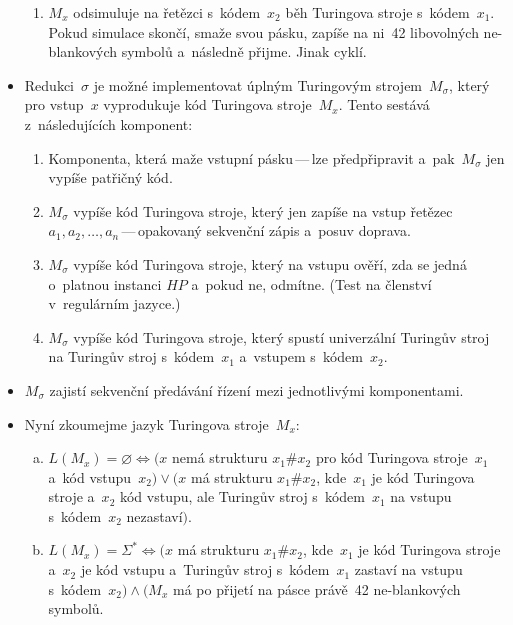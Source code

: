 \documentclass[a4paper, 11pt]{scrartcl}
\begin{document}
\begin{itemize}
\begin{enumerate}
				\item
					$ M_x $ odsimuluje na řetězci s~kódem~$ x_2 $ běh
					Turingova stroje s~kódem~$ x_1 $. Pokud simulace
					skončí, smaže svou pásku, zapíše na ni~42
					libovolných ne-blankových symbolů a~následně přijme.
					Jinak cyklí.
			\end{enumerate}

		\item
			Redukci~$ \sigma $ je možné implementovat úplným Turingovým
			strojem~$ M_\sigma $, který pro vstup~$ x $ vyprodukuje
			kód Turingova stroje~$ M_x $. Tento sestává z~následujících
			komponent:

			\begin{enumerate}
				\item
					Komponenta, která maže vstupní pásku\,---\,lze
					předpřipravit a~pak~$ M_\sigma $ jen vypíše
					patřičný kód.

				\item
					$ M_\sigma $ vypíše kód Turingova stroje, který
					jen zapíše na vstup řetězec $ a_1, a_2, \ldots,
					a_n $\,---\,opakovaný sekvenční zápis a~posuv
					doprava.

				\item
					$ M_\sigma $ vypíše kód Turingova stroje, který
					na vstupu ověří, zda se jedná o~platnou instanci
					$ HP $ a~pokud ne, odmítne. (Test na členství
					v~regulárním jazyce.)

				\item
					$ M_\sigma $ vypíše kód Turingova stroje, který
					spustí univerzální Turingův stroj na Turingův
					stroj s~kódem~$ x_1 $ a~vstupem s~kódem~$ x_2 $.
			\end{enumerate}

		\item
			$ M_\sigma $ zajistí sekvenční předávání řízení mezi
			jednotlivými komponentami.

		\item
			Nyní zkoumejme jazyk Turingova stroje~$ M_x $:

			\begin{enumerate}[a)]
				\item
					$ L(M_x) = \varnothing \Leftrightarrow ( x $
					nemá strukturu $ x_1\#x_2 $ pro kód Turingova
					stroje~$ x_1 $ a~kód vstupu~$ x_2) \vee ( x $
					má strukturu $ x_1\#x_2 $, kde~$ x_1 $ je kód
					Turingova stroje a~$ x_2 $ kód vstupu, ale
					Turingův stroj s~kódem~$ x_1 $ na vstupu
					s~kódem~$ x_2 $ nezastaví$ ) $.

				\item
					$ L(M_x) = \Sigma^* \Leftrightarrow ( x $
					má strukturu $ x_1\#x_2 $, kde~$ x_1 $ je kód
					Turingova stroje a~$ x_2 $ je kód vstupu
					a~Turingův stroj s~kódem~$ x_1 $ zastaví na
					vstupu s~kódem~$ x_2) \wedge (M_x $ má po
					přijetí na pásce právě~42 ne-blankových symbolů.
			\end{enumerate}


\end{itemize}
\end{document}

